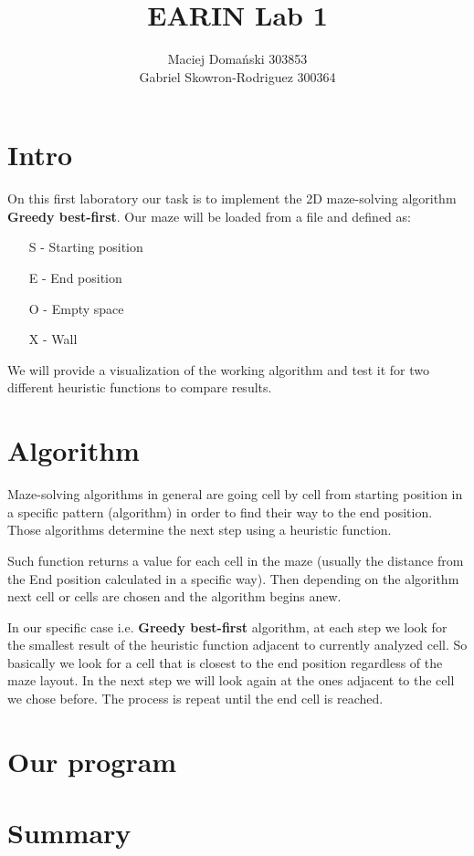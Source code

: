 \documentclass{article}
\title{EARIN Lab 1}
\author{Maciej Domański 303853 \\ Gabriel Skowron-Rodriguez 300364}
\begin{document}
\maketitle

\section{Intro}

On this first laboratory our task is to implement the 2D maze-solving algorithm \textbf{Greedy best-first}.
Our maze will be loaded from a file and defined as:
\begin{itemize}
    \item[S] - Starting position
    \item[E] - End position
    \item[O] - Empty space
    \item[X] - Wall
\end{itemize}

We will provide a visualization of the working algorithm and test it for two different heuristic functions to compare results.

\section{Algorithm}

Maze-solving algorithms in general are going cell by cell from starting position in a specific pattern (algorithm) in order to find their way to the end position.
Those algorithms determine the next step using a heuristic function.

Such function returns a value for each cell in the maze (usually the distance from the End position calculated in a specific way).
Then depending on the algorithm next cell or cells are chosen and the algorithm begins anew.

In our specific case i.e. \textbf{Greedy best-first} algorithm, at each step we look for the smallest result of the heuristic function adjacent to currently analyzed cell.
So basically we look for a cell that is closest to the end position regardless of the maze layout.
In the next step we will look again at the ones adjacent to the cell we chose before.
The process is repeat until the end cell is reached.


\section{Our program}


\section{Summary}
\end{document}
